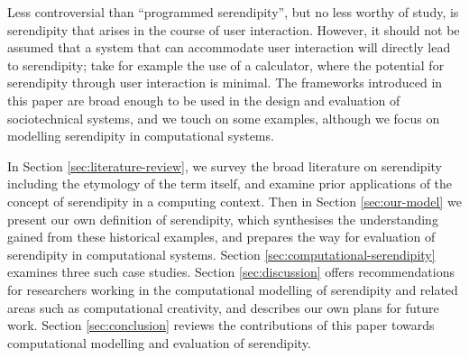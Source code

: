 Less controversial than ``programmed serendipity'', but no less worthy
of study, is serendipity that arises in the course of user
interaction.  However, it should not be assumed that a system that can
accommodate user interaction will directly lead to serendipity; take
for example the use of a calculator, where the potential for
serendipity through user interaction is minimal.  The frameworks
introduced in this paper are broad enough to be used in the design and evaluation of sociotechnical systems, and we touch on
some examples, although we focus on modelling serendipity in
computational systems.

In Section \ref{sec:literature-review}, we survey the broad literature
on serendipity including the etymology of the term itself, and examine
prior applications of the concept of serendipity in a computing
context.  Then in Section \ref{sec:our-model} we present our own
definition of serendipity, which synthesises the understanding gained
from these historical examples, and prepares the way for evaluation of
serendipity in computational systems.  Section
\ref{sec:computational-serendipity} examines three such case studies.
Section \ref{sec:discussion} offers recommendations for researchers
working in the computational modelling of serendipity and related
areas such as computational creativity, and describes our own plans
for future work.  Section \ref{sec:conclusion} reviews the
contributions of this paper towards computational modelling and
evaluation of serendipity.



